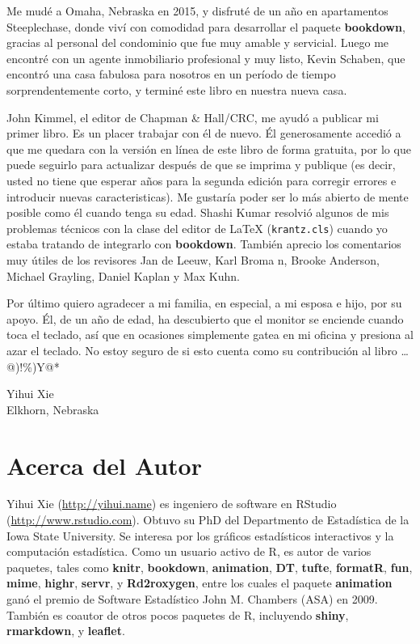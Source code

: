 \documentclass[12pt,]{krantz}
\theoremstyle{definition}
\theoremstyle{definition}
\theoremstyle{remark}
\let\BeginKnitrBlock\begin \let\EndKnitrBlock\end
\begin{document}
Me mudé a Omaha, Nebraska en 2015, y disfruté de un año en apartamentos
Steeplechase, donde viví con comodidad para desarrollar el paquete
\textbf{bookdown}, gracias al personal del condominio que fue muy amable
y servicial. Luego me encontré con un agente inmobiliario profesional y
muy listo, Kevin Schaben, que encontró una casa fabulosa para nosotros
en un período de tiempo sorprendentemente corto, y terminé este libro en
nuestra nueva casa.

John Kimmel, el editor de Chapman \& Hall/CRC, me ayudó a publicar mi
primer libro. Es un placer trabajar con él de nuevo. Él generosamente
accedió a que me quedara con la versión en línea de este libro de forma
gratuita, por lo que puede seguirlo para actualizar después de que se
imprima y publique (es decir, usted no tiene que esperar años para la
segunda edición para corregir errores e introducir nuevas
caracteristicas). Me gustaría poder ser lo más abierto de mente posible
como él cuando tenga su edad. Shashi Kumar resolvió algunos de mis
problemas técnicos con la clase del editor de LaTeX
(\texttt{krantz.cls}) cuando yo estaba tratando de integrarlo con
\textbf{bookdown}. También aprecio los comentarios muy útiles de los
revisores Jan de Leeuw, Karl Broma n, Brooke Anderson, Michael Grayling,
Daniel Kaplan y Max Kuhn.

Por último quiero agradecer a mi familia, en especial, a mi esposa e
hijo, por su apoyo. Él, de un año de edad, ha descubierto que el monitor
se enciende cuando toca el teclado, así que en ocasiones simplemente
gatea en mi oficina y presiona al azar el teclado. No estoy seguro de si
esto cuenta como su contribución al libro \ldots{} @)!\%)Y@*

\BeginKnitrBlock{flushright}
Yihui Xie\\
Elkhorn, Nebraska
\EndKnitrBlock{flushright}

\chapter*{Acerca del Autor}\label{acerca-del-autor}


Yihui Xie (\url{http://yihui.name}) es ingeniero de software en RStudio
(\url{http://www.rstudio.com}). Obtuvo su PhD del Departmento de
Estadística de la Iowa State University. Se interesa por los gráficos
estadísticos interactivos y la computación estadística. Como un usuario
activo de R, es autor de varios paquetes, tales como \textbf{knitr},
\textbf{bookdown}, \textbf{animation}, \textbf{DT}, \textbf{tufte},
\textbf{formatR}, \textbf{fun}, \textbf{mime}, \textbf{highr},
\textbf{servr}, y \textbf{Rd2roxygen}, entre los cuales el paquete
\textbf{animation} ganó el premio de Software Estadístico John M.
Chambers (ASA) en 2009. También es coautor de otros pocos paquetes de R,
incluyendo \textbf{shiny}, \textbf{rmarkdown}, y \textbf{leaflet}.
\end{document}
